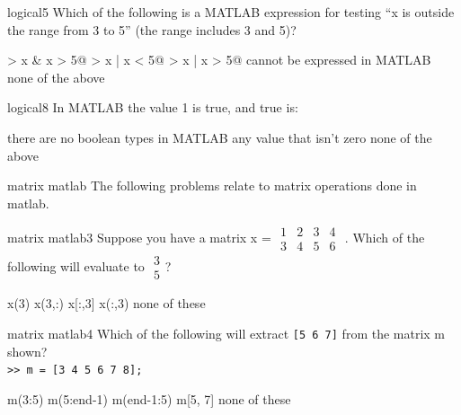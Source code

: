 \documentclass{exam}
\begin{document}
\begin{problem}[requires=logical]{logical}{5} 
  Which of the following is a MATLAB expression for testing ``x is
  outside the range from 3 to 5'' (the range includes 3 and 5)? 
  \begin{answers}  
    \answer {} > x & x > 5@
    \answer {} > x | x < 5@
    \answer[correct]  > x | x > 5@ %
    \answer[fixed] cannot be expressed in MATLAB %
    \answer[fixed] none of the above %
  \end{answers}
\end{problem}

\begin{problem}[require=logical]{logical}{8} 
  In MATLAB the value 1 is true, and true is:
  \begin{answers} 
    \answer there are no boolean types in MATLAB
    \answer[correct] any value that isn't zero %
    \answer[fixed] none of the above %
  \end{answers}
\end{problem}

\begin{block}{matrix matlab}
The following problems relate to matrix operations done in matlab.
\end{block}

\begin{problem}[requires=matrix matlab]{matrix matlab}{3}
 Suppose you have a matrix x = \footnotesize
$\begin{array}{cccc}1 & 2 & 3 & 4\\3 & 4 & 5 & 6\end{array}$
\normalsize. Which of the following will evaluate to \footnotesize
$\begin{array}{c}3 \\ 5\end{array}$\normalsize?
  \begin{answers}   
    \answer x(3)
    \answer x(3,:)
    \answer x[:,3]
    \answer[correct] x(:,3) %
    \answer[fixed] none of these %
   \end{answers}
\end{problem}

\begin{problem}[requires=matrix matlab]{matrix matlab}{4} 
  Which of the following will extract \texttt{[5 6 7]} from the matrix m
  shown?\\
\texttt{>> m = [3 4 5 6 7 8];
}
  \begin{answers}
    \answer[correct] m(3:5) %
    \answer m(5:end-1)
    \answer m(end-1:5)
    \answer m[5, 7]
    \answer[fixed] none of these %
  \end{answers}
\end{problem}
\end{document}
